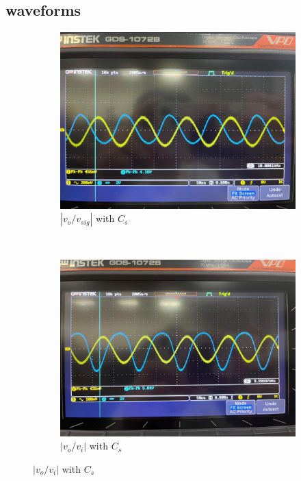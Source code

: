 \documentclass{article}
\begin{document}
\begin{CJK*}{UTF8}{bkai}
\subsection*{waveforms}
\begin{figure}[h]
    \begin{center}
    
        \begin{subfigure}[b]{0.35\textwidth}
            \includegraphics[width=\textwidth]{vsig_cs.jpg}
            \caption{$\left\lvert v_o/v_{sig} \right\rvert$ with $C_s$}
        \end{subfigure}
        ~
        \begin{subfigure}[b]{0.35\textwidth}
            \includegraphics[width=\textwidth]{vi_cs.jpg}
            \caption{$\left\lvert v_o/v_{i} \right\rvert$ with $C_s$}
        \end{subfigure}


\end{center}
\end{figure}
\end{CJK*}
\end{document}
